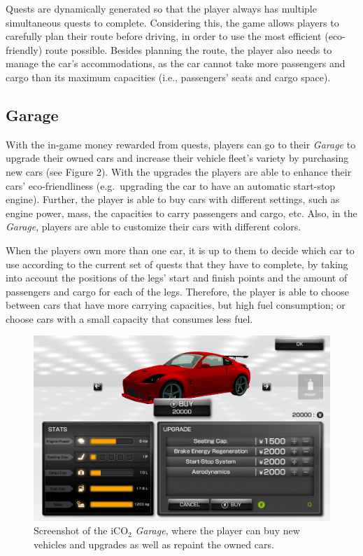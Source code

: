 \documentclass[preprint,authoryear,12pt]{elsarticle}
\begin{document}
Quests are dynamically generated so that the player always has multiple simultaneous quests to complete. Considering this, the game allows players to carefully plan their route before driving, in order to use the most efficient (eco-friendly) route possible. Besides planning the route, the player also needs to manage the car's accommodations, as the car cannot take more passengers and cargo than its maximum capacities (i.e., passengers' seats and cargo space).

\subsection{Garage}

With the in-game money rewarded from quests, players can go to their \textit{Garage} to upgrade their owned cars and increase their vehicle fleet's variety by purchasing new cars (see Figure 2). With the upgrades the players are able to enhance their cars' eco-friendliness (e.g.~upgrading the car to have an automatic start-stop engine). Further, the player is able to buy cars with different settings, such as engine power, mass, the capacities to carry passengers and cargo, etc. Also, in the \textit{Garage}, players are able to customize their cars with different colors.

When the players own more than one car, it is up to them to decide which car to use according to the current set of quests that they have to complete, by taking into account the positions of the legs' start and finish points and the amount of passengers and cargo for each of the legs. Therefore, the player is able to choose between cars that have more carrying capacities, but high fuel consumption; or choose cars with a small capacity that consumes less fuel.


\begin{figure}[htb]
\begin{center}
\includegraphics[width=.80\linewidth]{ijhcs14-img/iCO2_garage}
\caption{Screenshot of the iCO$_2$ \textit{Garage}, where the player can buy new vehicles and upgrades as well as repaint the owned cars.\label{fig:iCO2_garage}}
\end{center}
\end{figure}
\end{document}
